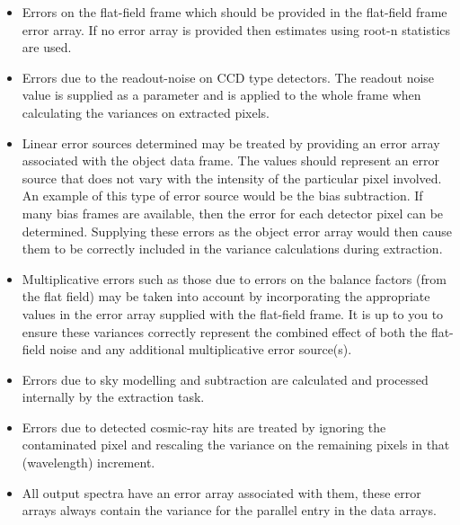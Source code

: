 \documentclass[11pt,twoside]{article}
\newcommand{\myindex}[1]{\index{#1}}
\renewcommand{\myindex}[1]{}
\begin{document}
\begin{itemize}

\item Errors on the flat-field frame which should be provided in the
      flat-field frame error array.  If no error array is provided then
      estimates using root-n statistics are used.

\myindex{Readout noise}
\item Errors due to the readout-noise on CCD type detectors. The
      readout noise value is supplied as a parameter and is applied to the
      whole frame when calculating the variances on extracted pixels.

\myindex{Errors!additive}
\item Linear error sources determined may be treated by
      providing an error array associated with the object data frame. The
      values should represent an error source that does not vary with the
      intensity of the particular pixel involved. An example of this type
      of error source would be the bias subtraction. If many bias frames
      are available, then the error  for each detector pixel can be
      determined.
      Supplying these errors as the object error array
      would then cause them to be correctly included in the variance
      calculations during extraction.

\myindex{Errors!multiplicative}
\item Multiplicative errors such as those due to errors on the balance
      factors (from the flat field) may be taken into account by
      incorporating the appropriate values in the error array supplied with
      the flat-field frame. It is up to you to ensure these variances
      correctly represent the combined effect of both the flat-field noise
      and any additional multiplicative error source(s).

\myindex{Sky!errors}
\myindex{Errors!Sky model}
\item Errors due to sky modelling and subtraction are calculated and
      processed internally by the extraction task.

\myindex{Errors!due to cosmic rays}
\item Errors due to detected cosmic-ray hits are treated by ignoring the
      contaminated pixel and rescaling the variance on the remaining pixels
      in that (wavelength) increment.

\myindex{Errors!output}
\item All output spectra have an error array associated with them, these
      error arrays always contain the variance for the parallel entry in
      the data arrays.

\end{itemize}
\end{document}
